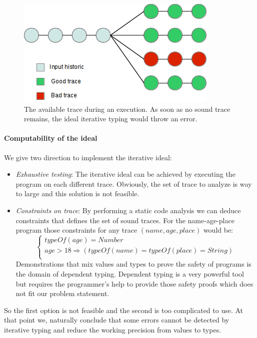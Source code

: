 \documentclass[a4paper]{report}
\begin{document}
\begin{figure}
\centering
\includegraphics{images/trace.png}
\caption{The available trace during an execution. As soon as no sound trace remains, the ideal iterative typing would throw an error.}
\label{trace}
\end{figure}

\paragraph{Computability of the ideal} We give two direction to implement the iterative ideal:
\begin{itemize}
\item \emph{Exhaustive testing}: The iterative ideal can be achieved by executing the program on each different trace. Obviously, the set of trace to analyze is way to large and this solution is not feasible. 
\item \emph{Constraints on trace}: By performing a static code analysis we can deduce constraints that defines the set of sound traces. For the name-age-place program those constraints for any trace $(name,age,place)$ would be:
$$\left\{\begin{array}{l}
typeOf(age)=Number\\
age > 18 \Rightarrow (typeOf(name) = typeOf(place) = String)\\
\end{array}\right.$$
Demonstrations that mix values and types to prove the safety of programs is the domain of dependent typing. Dependent typing is a very powerful tool but requires the programmer's help to provide those safety proofs which does not fit our problem statement\cite{dep}.
\end{itemize}
So the first option is not feasible and the second is too complicated to use. At that point we, naturally conclude that some errors cannot be detected by iterative typing and reduce the working precision from values to types.
\end{document}
